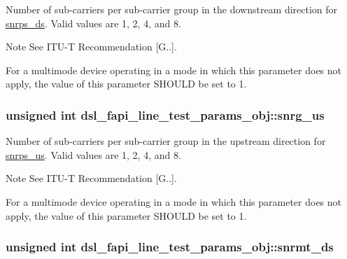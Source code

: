 Number of sub-\/carriers per sub-\/carrier group in the downstream direction for \hyperlink{structdsl__fapi__line__test__params__obj_a31f5916b0efd18693c30ac5ab6bf95e0}{snrps\-\_\-ds}. Valid values are 1, 2, 4, and 8. \begin{DoxyNote}{Note}
See I\-T\-U-\/\-T Recommendation \mbox{[}G..\mbox{]}. 

For a multimode device operating in a mode in which this parameter does not apply, the value of this parameter S\-H\-O\-U\-L\-D be set to 1. 
\end{DoxyNote}
\hypertarget{structdsl__fapi__line__test__params__obj_aab1050460405b591f11366b8f0109e52}{
\subsubsection[{snrg\-\_\-us}]{\setlength{\rightskip}{0pt plus 5cm}unsigned int dsl\-\_\-fapi\-\_\-line\-\_\-test\-\_\-params\-\_\-obj\-::snrg\-\_\-us}}\label{structdsl__fapi__line__test__params__obj_aab1050460405b591f11366b8f0109e52}
Number of sub-\/carriers per sub-\/carrier group in the upstream direction for \hyperlink{structdsl__fapi__line__test__params__obj_a2bb54209cc9ef6b6e17b57b723e59293}{snrps\-\_\-us}. Valid values are 1, 2, 4, and 8. \begin{DoxyNote}{Note}
See I\-T\-U-\/\-T Recommendation \mbox{[}G..\mbox{]}. 

For a multimode device operating in a mode in which this parameter does not apply, the value of this parameter S\-H\-O\-U\-L\-D be set to 1. 
\end{DoxyNote}
\hypertarget{structdsl__fapi__line__test__params__obj_a4fac6ebeb3e66e201680646e0118d406}{
\subsubsection[{snrmt\-\_\-ds}]{\setlength{\rightskip}{0pt plus 5cm}unsigned int dsl\-\_\-fapi\-\_\-line\-\_\-test\-\_\-params\-\_\-obj\-::snrmt\-\_\-ds}}\label{structdsl__fapi__line__test__params__obj_a4fac6ebeb3e66e201680646e0118d406}
